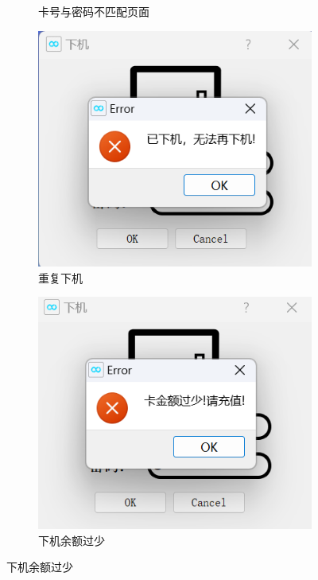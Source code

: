 \documentclass{article}
\begin{document}
\begin{figure}[htbp]
\begin{subfigure}{0.24\linewidth}
            \caption{卡号与密码不匹配页面}
            \label{settle_id_password_error}
        \end{subfigure}
        \centering
        \begin{subfigure}{0.24\linewidth}
            \centering
            \includegraphics[width=\linewidth]{figure/settle_repeat.png}
            \caption{重复下机}
            \label{settle_repeat}
        \end{subfigure}
        \centering
        \begin{subfigure}{0.24\linewidth}
            \centering
            \includegraphics[width=\linewidth]{figure/settle_less_money.png}
            \caption{下机余额过少}
            \label{settle_less_money}
        \end{subfigure}
    \end{figure}
\end{document}

